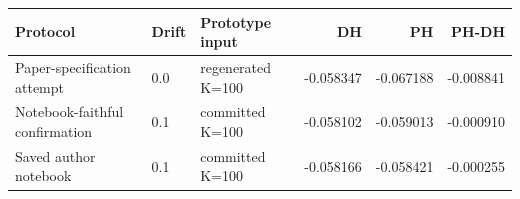 \begin{tabular}{lllrrr}
\toprule
Protocol & Drift & Prototype input & DH & PH & PH-DH \\
\midrule
Paper-specification attempt & 0.0 & regenerated K=100 & -0.058347 & -0.067188 & -0.008841 \\
Notebook-faithful confirmation & 0.1 & committed K=100 & -0.058102 & -0.059013 & -0.000910 \\
Saved author notebook & 0.1 & committed K=100 & -0.058166 & -0.058421 & -0.000255 \\
\bottomrule
\end{tabular}
